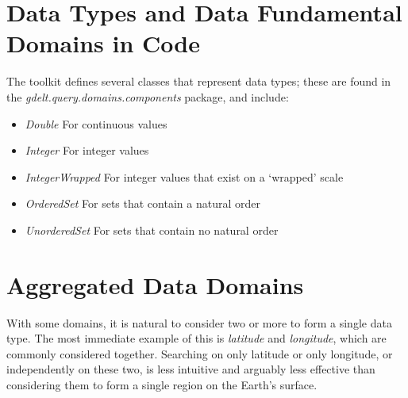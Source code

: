 
\section{Data Types and Data Fundamental Domains in \gdgas Code}
The \gdgas toolkit defines several classes that represent data types; these are found in the \textit{gdelt.query.domains.components} package, and include:

\begin{itemize}
\item \textit{Double} For continuous values
\item \textit{Integer} For integer values
\item \textit{IntegerWrapped} For integer values that exist on a `wrapped' scale
\item \textit{OrderedSet} For sets that contain a natural order
\item \textit{UnorderedSet} For sets that contain no natural order
\end{itemize}

\section{Aggregated Data Domains}
With some domains, it is natural to consider two or more to form a single data type.
The most immediate example of this is \textit{latitude} and \textit{longitude}, which are commonly considered together. Searching on only latitude or only longitude, or independently on these two, is less intuitive and arguably less effective than considering them to form a single region on the Earth's surface.

